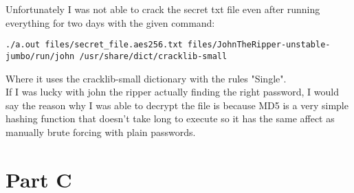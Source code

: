 \documentclass[12pt]{article}
\begin{document}
Unfortunately I was not able to crack the secret txt file even after running everything for two days with the given command:
\begin{lstlisting}
./a.out files/secret_file.aes256.txt files/JohnTheRipper-unstable-jumbo/run/john /usr/share/dict/cracklib-small
\end{lstlisting}
Where it uses the cracklib-small dictionary with the rules "Single". \\

If I was lucky with john the ripper actually finding the right password, I would say the reason why I was able to decrypt the file is because MD5 is a very simple hashing function that doesn't take long to execute so it has the same affect as manually brute forcing with plain passwords.

\part*{Part C}
\end{document}

